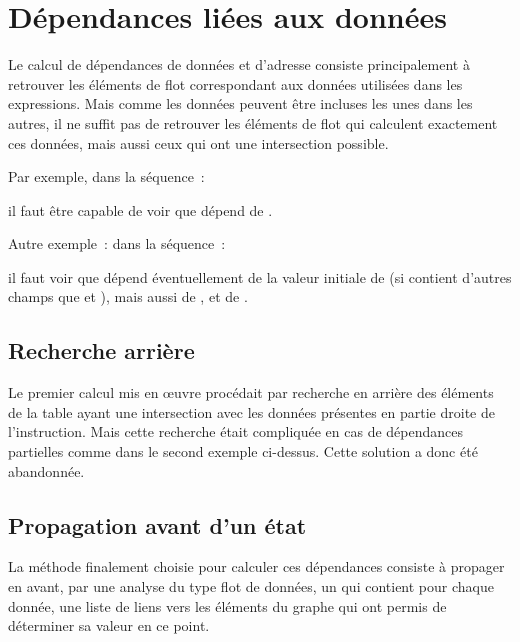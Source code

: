 \chapter{Dépendances liées aux données}

Le calcul de dépendances de données et d'adresse consiste principalement
à retrouver les éléments de flot correspondant aux données utilisées dans les
expressions.
Mais comme les données peuvent être incluses les unes dans les
autres, il ne suffit pas de retrouver les éléments de flot qui calculent
exactement ces données, mais aussi ceux qui ont une intersection possible.

Par exemple, dans la séquence~:\\
  \centerline{}

il faut être capable de voir que  dépend de .

Autre exemple~: dans la séquence~:\\
\centerline{}

il faut voir que  dépend éventuellement de la valeur initiale de 
(si  contient d'autres champs que  et ), mais aussi
de , et de .\\

\section{Recherche arrière}

Le premier calcul mis en {\oe}uvre procédait par recherche en arrière
des éléments de la table ayant une intersection avec les données présentes en
partie droite de l'instruction. Mais cette recherche était compliquée en cas de
dépendances partielles comme dans le second exemple ci-dessus. Cette solution a
donc été abandonnée.

\section{Propagation avant d'un état}\label{sec-propagation-etat}

La méthode finalement choisie pour calculer ces dépendances
consiste à propager en avant, par une analyse du type flot de données,
un 
qui contient pour chaque donnée, une liste de liens vers les éléments
du graphe qui ont permis de déterminer sa valeur en ce point.

